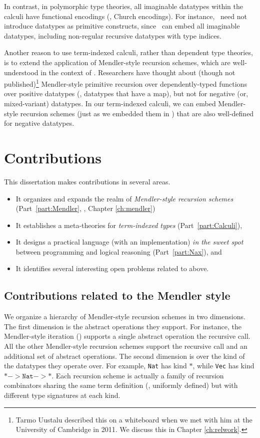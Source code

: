 In contrast, in polymorphic type theories, all imaginable datatypes
within the calculi have functional encodings (\eg, Church encodings).
For instance, \Fw\ need not introduce datatypes as primitive constructs,
since \Fw\ can embed all imaginable datatypes, including non-regular
recursive datatypes with type indices. 

Another reason to use term-indexed calculi, rather than dependent type theories,
is to extend the application of Mendler-style recursion schemes,
which are well-understood in the context of \Fw.
Researchers have thought about (though not published)\footnote{
     Tarmo Uustalu described this on a whiteboard
     when we met with him at the University of Cambridge in 2011.
     We discuss this in Chapter \ref{ch:relwork}.}
Mendler-style primitive recursion over dependently-typed functions
over positive datatypes (\ie, datatypes that have a map), but not for
negative (or, mixed-variant) datatypes. In our term-indexed calculi,
we can embed Mendler-style recursion schemes (just as we embedded them in \Fw)
that are also well-defined for negative datatypes.

\section{Contributions}\label{sec:intro:contrib}
This dissertation makes contributions in several areas.
\begin{itemize}
\item[1.]
It organizes and expands the realm of \emph{Mendler-style recursion schemes}
(Part~\ref{part:Mendler}, \ie, Chapter \ref{ch:mendler})

\item[2.] It establishes a meta-theories for \emph{term-indexed types}
        (Part~\ref{part:Calculi}),

\item[3.] It designs a practical language (with an implementation)
        \emph{in the sweet spot} between programming and logical reasoning
        (Part~\ref{part:Nax}), and

\item[4.] It identifies several interesting open problems related to above.
\end{itemize}

\subsection{Contributions related to the Mendler style}
We organize a hierarchy of Mendler-style recursion schemes in two dimensions.
The first dimension is the abstract operations they support. For instance,
the Mendler-style iteration (\MIt) supports a single abstract operation
the recursive call. All the other Mendler-style recursion schemes
support the recursive call and an additional set of abstract operations. 
The second dimension is over the kind of the datatypes they operate over.
For example, \texttt{Nat} has kind $*$, while \texttt{Vec}
has kind $* -> \mathtt{Nat} -> *$. Each recursion scheme is actually a
family of recursion combinators sharing the same term definition
(\ie, uniformly defined) but with different type signatures at each kind.

